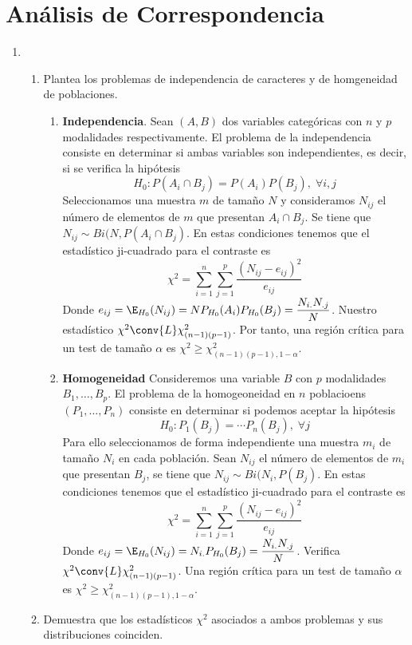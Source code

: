 \documentclass[twoside]{article}
\begin{document}
\section{Análisis de Correspondencia}
\begin{enumerate}
\item 
\begin{enumerate}
\item Plantea los problemas de independencia de caracteres y de homgeneidad de poblaciones.

\begin{enumerate}
\item[] \textbf{Independencia}. Sean $(A,B)$ dos variables categóricas con $n$ y $p$ modalidades respectivamente. El problema de la independencia consiste en determinar si ambas variables son independientes, es decir, si se verifica la hipótesis
$$
H_0\colon P(A_i\cap B_j) = P(A_i)P(B_j), \; \forall i,j
$$
Seleccionamos una muestra $m$ de tamaño $N$ y consideramos $N_{ij}$ el número de elementos de $m$ que presentan $A_i\cap B_j$. Se tiene que $N_{ij}\sim Bi(N,P(A_i\cap B_j)$. En estas condiciones tenemos que el estadístico ji-cuadrado para el contraste es
$$
\chi^2 = \sum_{i=1}^n \sum_{j=1}^p \frac{(N_{ij}-e_{ij})^2}{e_{ij}}
$$
Donde $e_{ij} = \E_{H_0}(N_{ij}) = NP_{H_0}(A_i)P_{H_0}(B_j) = \dfrac{N_{i.}N_{.j}}{N}$. Nuestro estadístico $\chi^2 \conv{L}\chi^2_{(n-1)(p-1)}$. Por tanto, una región crítica para un test de tamaño $\alpha$ es $\chi^2 \geq \chi^2_{(n-1)(p-1),1-\alpha}$.
\item[] \textbf{Homogeneidad} Consideremos una variable $B$ con $p$ modalidades $B_1,\dotsc,B_p$. El problema de la homogeoneidad en $n$ poblacioens $(P_1,\dotsc,P_n)$ consiste en determinar si podemos aceptar la hipótesis
$$
H_0\colon P_1(B_j) = \cdots P_n(B_j),\;\forall j
$$
Para ello seleccionamos de forma independiente una muestra $m_i$ de tamaño $N_i$ en cada población. Sean $N_{ij}$ el número de elementos de $m_i$ que presentan $B_j$, se tiene que $N_{ij}\sim Bi(N_i,P(B_j)$. En estas condiciones tenemos que el estadístico ji-cuadrado para el contraste es
$$
\chi^2 = \sum_{i=1}^n \sum_{j=1}^p \frac{(N_{ij}-e_{ij})^2}{e_{ij}}
$$
Donde $e_{ij} = \E_{H_0}(N_{ij}) = N_{i.}P_{H_0}(B_j) = \dfrac{N_{i.}N_{.j}}{N}$. Verifica $\chi^2 \conv{L}\chi^2_{(n-1)(p-1)}$. Una región crítica para un test de tamaño $\alpha$ es $\chi^2 \geq \chi^2_{(n-1)(p-1),1-\alpha}$.
\end{enumerate}

\item Demuestra que los estadísticos $\chi^2$ asociados a ambos problemas y sus distribuciones coinciden.


\end{enumerate}
\end{enumerate}
\end{document}
